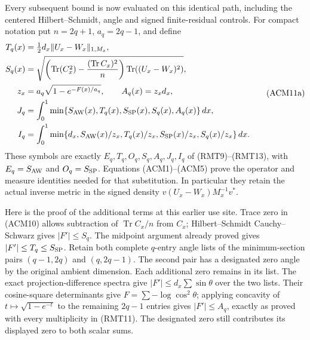 Every subsequent bound is now evaluated on this identical path, including
the centered Hilbert--Schmidt, angle and signed finite-residual controls.
For compact notation put $n=2q+1$, $a_q=2q-1$, and define
\[
\begin{split}
 T_q(x)&=\tfrac12d_x\|U_x-W_x\|_{1,M_x},\\
 S_q(x)&=\sqrt{\left(\operatorname{Tr}(C_x^2)
       -\frac{(\operatorname{Tr}C_x)^2}{n}\right)
                    \operatorname{Tr}((U_x-W_x)^2)},\\
 z_x&=a_q\sqrt{1-e^{-F(x)/a_q}},\qquad A_q(x)=z_xd_x,\\
 J_q&=\int_0^1\min\{S_{\rm AW}(x),T_q(x),S_{\rm SP}(x),
                                      S_q(x),A_q(x)\}\,dx,\\
 I_q&=\int_0^1\min\{d_x,S_{\rm AW}(x)/z_x,T_q(x)/z_x,
                         S_{\rm SP}(x)/z_x,S_q(x)/z_x\}\,dx.
\end{split}
\tag{ACM11a}
\]
These symbols are exactly $E_q,T_q,O_q,S_q,A_q,J_q,I_q$ of
(RMT9)--(RMT13), with $E_q=S_{\rm AW}$ and $O_q=S_{\rm SP}$.
Equations (ACM1)--(ACM5) prove the operator and measure identities
needed for that substitution. In particular they retain the actual
inverse metric in the signed density $v(U_x-W_x)M_x^{-1}v^*$.

Here is the proof of the additional terms at this earlier use site.
Trace zero in (ACM10) allows subtraction of $\operatorname{Tr}C_x/n$
from $C_x$; Hilbert--Schmidt Cauchy--Schwarz gives $|F'|\leq S_q$.
The midpoint argument already proved gives $|F'|\leq T_q\leq S_{\rm SP}$.
Retain both complete $q$-entry angle lists of the minimum-section
pairs $(q-1,2q)$ and $(q,2q-1)$. The second pair has a designated
zero angle by the original ambient dimension. Each additional zero
remains in its list. The exact projection-difference spectra give
$|F'|\leq d_x\sum\sin\theta$ over the two lists. Their cosine-square
determinants give $F=\sum-\log\cos^2\theta$; applying concavity of
$t\mapsto\sqrt{1-e^{-t}}$ to the remaining $2q-1$ entries gives
$|F'|\leq A_q$, exactly as proved with every multiplicity in
(RMT11). The designated zero still contributes its displayed zero
to both scalar sums.

